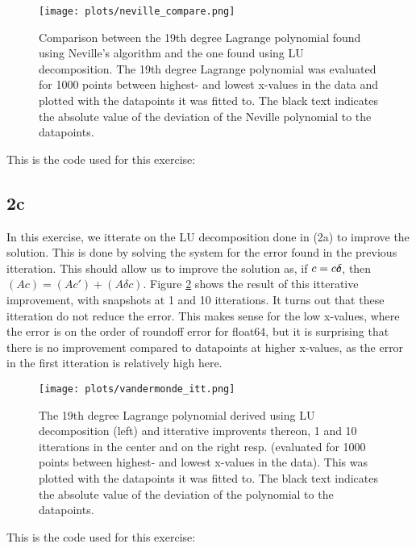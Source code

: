 \begin{figure}
    \centering
    \texttt{[image: plots/neville\_compare.png]}
    \caption{Comparison between the 19th degree Lagrange polynomial found
    using Neville's algorithm and the one found using LU decomposition. The 
    19th degree Lagrange polynomial was evaluated for 1000 points between 
    highest- and lowest x-values in the data and plotted with the datapoints 
    it was fitted to. The black text indicates the absolute value of the 
    deviation of the Neville polynomial to the datapoints.}
    \label{fig:neville}
\end{figure}

\noindent
This is the code used for this exercise:


\subsection*{2c}
In this exercise, we itterate on the LU decomposition done in (2a) to improve
the solution. This is done by solving the system for the error found in the
previous itteration. This should allow us to improve the solution as, if $c=c\mathaccent+\delta c$,
then $(A c)=(A c')+(A \delta c)$.
Figure \ref{fig:lu_itt} shows the result of this itterative improvement, with
snapshots at 1 and 10 itterations.
It turns out that these itteration do not reduce the error. This makes sense for the low x-values, where the error is on the
order of roundoff error for float64, but it is surprising that there is no improvement compared to datapoints at higher x-values,
as the error in the first itteration is relatively high here.

\begin{figure}
    \centering
    \texttt{[image: plots/vandermonde\_itt.png]}
    \caption{The 19th degree Lagrange polynomial derived using LU 
    decomposition (left) and itterative improvents thereon, 1 and 10 
    itterations in the center and on the right resp. (evaluated for 1000 
    points between highest- and lowest x-values in the data). This was 
    plotted with the datapoints it was fitted to. The black text indicates 
    the absolute value of the deviation of the polynomial to the datapoints.}
    \label{fig:lu_itt}
\end{figure}

\noindent
This is the code used for this exercise:


